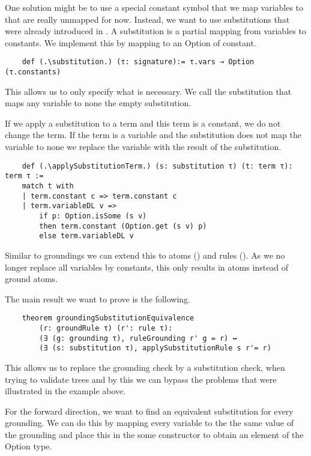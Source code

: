     One solution might be to use a special constant symbol that we map variables to that are really unmapped for now.
    Instead, we want to use substitutions that were already introduced in \cite{datalogCoq}. A substitution is a partial mapping from variables to constants. We implement this by mapping to an Option of constant.

    \begin{lstlisting}
    def (.\substitution.) (τ: signature):= τ.vars → Option (τ.constants)
    \end{lstlisting}

    This allows us to only specify what is necessary. We call the substitution that maps any variable to none the empty substitution.
    
    If we apply a substitution to a term and this term is a constant, we do not change the term. If the term is a variable and the substitution does not map the variable to none we replace the variable with the result of the substitution.

    \begin{lstlisting}
    def (.\applySubstitutionTerm.) (s: substitution τ) (t: term τ): term τ :=
    match t with
    | term.constant c => term.constant c
    | term.variableDL v => 
        if p: Option.isSome (s v) 
        then term.constant (Option.get (s v) p) 
        else term.variableDL v
    \end{lstlisting}

    Similar to groundings we can extend this to atoms (\applySubstitutionAtom) and rules (\applySubstitutionRule). As we no longer replace all variables by constants, this only results in atoms instead of ground atoms.

    The main result we want to prove is the following.

    \begin{lstlisting}
    theorem groundingSubstitutionEquivalence 
        (r: groundRule τ) (r': rule τ):
        (∃ (g: grounding τ), ruleGrounding r' g = r) ↔ 
        (∃ (s: substitution τ), applySubstitutionRule s r'= r)
    \end{lstlisting}

    This allows us to replace the grounding check by a substitution check, when trying to validate trees and by this we can bypass the problems that were illustrated in the example above. 

    For the forward direction, we want to find an equivalent substitution for every grounding. We can do this by mapping every variable to the the same value of the grounding and place this in the some constructor to obtain an element of the Option type.

